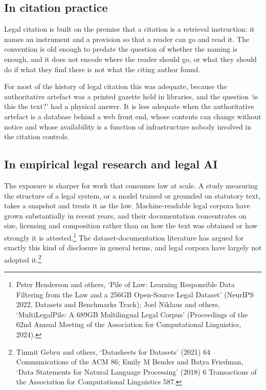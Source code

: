 \documentclass[11pt]{article}
\begin{document}
\subsection{In citation practice}

Legal citation is built on the premise that a citation is a retrieval
instruction: it names an instrument and a provision so that a reader can go and
read it. The convention is old enough to predate the question of whether the
naming is enough, and it does not encode where the reader should go, or what
they should do if what they find there is not what the citing author found.

For most of the history of legal citation this was adequate, because the
authoritative artefact was a printed gazette held in libraries, and the
question `is this the text?' had a physical answer. It is less adequate when
the authoritative artefact is a database behind a web front end, whose contents
can change without notice and whose availability is a function of
infrastructure nobody involved in the citation controls.

\subsection{In empirical legal research and legal AI}

The exposure is sharper for work that consumes law at scale. A study measuring
the structure of a legal system, or a model trained or grounded on statutory
text, takes a snapshot and treats it as the law. Machine-readable legal corpora
have grown substantially in recent years, and their documentation concentrates
on size, licensing and composition rather than on how the text was obtained or
how strongly it is attested.\footnote{Peter Henderson and others, `Pile of Law:
Learning Responsible Data Filtering from the Law and a 256GB Open-Source Legal
Dataset' (NeurIPS 2022, Datasets and Benchmarks Track); Joel Niklaus and
others, `MultiLegalPile: A 689GB Multilingual Legal Corpus' (Proceedings of the
62nd Annual Meeting of the Association for Computational Linguistics, 2024).}
The dataset-documentation literature has argued for exactly this kind of
disclosure in general terms, and legal corpora have largely not adopted
it.\footnote{Timnit Gebru and others, `Datasheets for Datasets' (2021) 64
Communications of the ACM 86; Emily M Bender and Batya Friedman, `Data
Statements for Natural Language Processing' (2018) 6 Transactions of the
Association for Computational Linguistics 587.}
\end{document}
